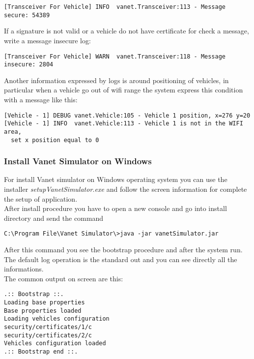\begin{verbatim}
[Transceiver For Vehicle] INFO  vanet.Transceiver:113 - Message secure: 54389
\end{verbatim}
If a signature is not valid or a vehicle do not have certificate for check a message, write a message insecure log:
\begin{verbatim}
[Transceiver For Vehicle] WARN  vanet.Transceiver:118 - Message insecure: 2804
\end{verbatim}
Another information expressed by logs is around positioning of vehicles, in particular when a vehicle go out of wifi range the system express this condition with a message like this:
\begin{verbatim}
[Vehicle - 1] DEBUG vanet.Vehicle:105 - Vehicle 1 position, x=276 y=20
[Vehicle - 1] INFO  vanet.Vehicle:113 - Vehicle 1 is not in the WIFI area, 
  set x position equal to 0
\end{verbatim}
\subsubsection{Install Vanet Simulator on Windows}
For install Vanet simulator on Windows operating system you can use the installer \textit{setupVanetSimulator.exe} and follow the screen information for complete the setup of application.\\
After install procedure you have to open a new console and go into install directory and send the command
\begin{verbatim}
C:\Program File\Vanet Simulator\>java -jar vanetSimulator.jar
\end{verbatim}
After this command you see the bootstrap procedure and after the system run. The default log operation is the standard out and you can see directly all the informations.\\
The common output on screen are this:
\begin{verbatim}
.:: Bootstrap ::.
Loading base properties
Base properties loaded
Loading vehicles configuration
security/certificates/1/c
security/certificates/2/c
Vehicles configuration loaded
.:: Bootstrap end ::.
\end{verbatim}
